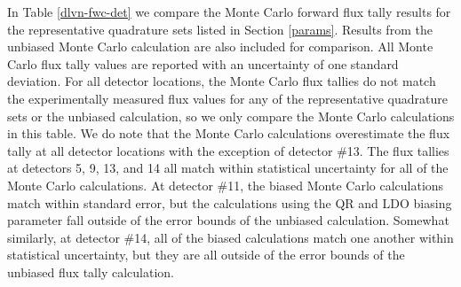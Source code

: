 In Table \ref{dlvn-fwc-det} we compare the Monte Carlo forward flux tally results for the 
representative quadrature sets listed in Section \ref{params}. Results from the unbiased Monte 
Carlo calculation are also included for comparison. All Monte Carlo
flux tally values are reported with an uncertainty of one standard deviation. For all detector
locations, the Monte Carlo flux tallies do not match the experimentally measured flux values for
any of the representative quadrature sets or the unbiased calculation, so we only compare the
Monte Carlo calculations in this table. We do note that the Monte Carlo calculations
overestimate the flux tally at all detector locations with the exception of detector \#13.
The flux tallies at detectors 5, 9, 13, and 14 all match within statistical uncertainty for all
of the Monte Carlo calculations. At detector \#11, the biased Monte Carlo calculations match
within standard error, but the calculations using the QR and LDO biasing parameter fall outside
of the error bounds of the unbiased calculation. Somewhat similarly, at detector \#14, all of
the biased calculations match one another within statistical uncertainty, but they are all
outside of the error bounds of the unbiased flux tally calculation.

